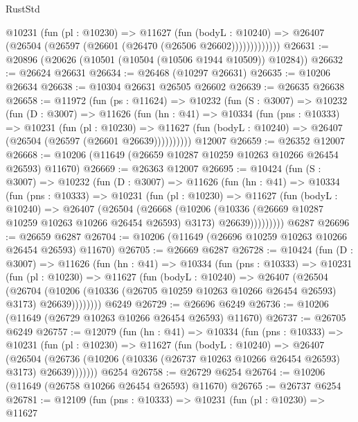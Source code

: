 \begin{lexlean}{RustStd}
\begin{coremodule}
              @10231
                (fun (pl : @10230) =>
                @11627
                  (fun (bodyL : @10240) =>
                  @26407 (@26504 (@26597 (@26601 (@26470 (@26506 @26602)))))))))))))
@26631 := @20896 (@20626 (@10501 (@10504 (@10506 @1944 @10509)) @10284))
@26632 := @26624 @26631
@26634 := @26468 (@10297 @26631)
@26635 := @10206 @26634
@26638 := @10304 @26631 @26505 @26602
@26639 := @26635 @26638
@26658 := @11972
    (fun (ps : @11624) =>
    @10232
      (fun (S : @3007) =>
      @10232
        (fun (D : @3007) =>
        @11626
          (fun (hn : @41) =>
          @10334
            (fun (pns : @10333) =>
            @10231
              (fun (pl : @10230) =>
              @11627 (fun (bodyL : @10240) => @26407 (@26504 (@26597 (@26601 @26639))))))))))
    @12007
@26659 := @26352 @12007
@26668 := @10206 (@11649 (@26659 @10287 @10259 @10263 @10266 @26454 @26593) @11670)
@26669 := @26363 @12007
@26695 := @10424
    (fun (S : @3007) =>
    @10232
      (fun (D : @3007) =>
      @11626
        (fun (hn : @41) =>
        @10334
          (fun (pns : @10333) =>
          @10231
            (fun (pl : @10230) =>
            @11627
              (fun (bodyL : @10240) =>
              @26407
                (@26504
                  (@26668
                    (@10206
                      (@10336 (@26669 @10287 @10259 @10263 @10266 @26454 @26593) @3173)
                      @26639)))))))))
    @6287
@26696 := @26659 @6287
@26704 := @10206 (@11649 (@26696 @10259 @10263 @10266 @26454 @26593) @11670)
@26705 := @26669 @6287
@26728 := @10424
    (fun (D : @3007) =>
    @11626
      (fun (hn : @41) =>
      @10334
        (fun (pns : @10333) =>
        @10231
          (fun (pl : @10230) =>
          @11627
            (fun (bodyL : @10240) =>
            @26407
              (@26504
                (@26704
                  (@10206 (@10336 (@26705 @10259 @10263 @10266 @26454 @26593) @3173) @26639))))))))
    @6249
@26729 := @26696 @6249
@26736 := @10206 (@11649 (@26729 @10263 @10266 @26454 @26593) @11670)
@26737 := @26705 @6249
@26757 := @12079
    (fun (hn : @41) =>
    @10334
      (fun (pns : @10333) =>
      @10231
        (fun (pl : @10230) =>
        @11627
          (fun (bodyL : @10240) =>
          @26407
            (@26504
              (@26736 (@10206 (@10336 (@26737 @10263 @10266 @26454 @26593) @3173) @26639)))))))
    @6254
@26758 := @26729 @6254
@26764 := @10206 (@11649 (@26758 @10266 @26454 @26593) @11670)
@26765 := @26737 @6254
@26781 := @12109
    (fun (pns : @10333) =>
    @10231
      (fun (pl : @10230) =>
      @11627

\end{coremodule}
\end{lexlean}
